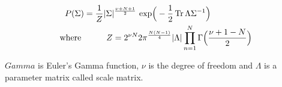            \begin{equation}
                \begin{split}
                    P(\Sigma) & = \frac{1}{Z} \vert\Sigma\vert^{\frac{\nu + N + 1}{2}} \text{ exp}\Big(-\frac{1}{2} \operatorname{Tr}{\Lambda \Sigma^{-1}}\Big) \\
                    \text{where } & \ \ \ \ \ \ \ \ Z = 2^{\nu N}{2} \pi^{\frac{N (N - 1)}{4}} \vert\Lambda\vert 
                    \prod\limits_{n=1}^{N} \Gamma\Big(\frac{\nu + 1 - N}{2}\Big)
                \end{split}
            \end{equation}

            $Gamma$ is Euler's Gamma function, $\nu$ is the degree of freedom and $\Lambda$ is a parameter matrix called scale matrix.
